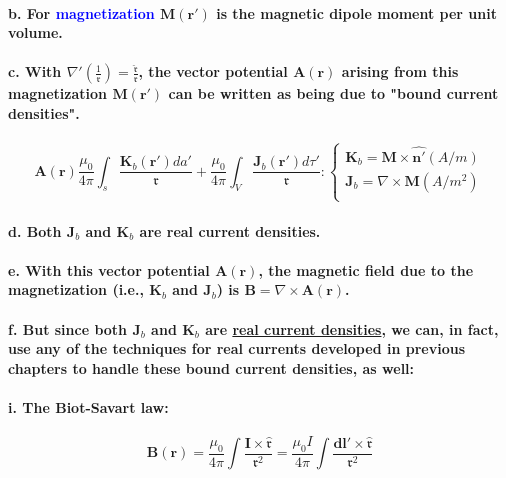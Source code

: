 \documentclass{article}
\begin{document}
\paragraph{\indent b. For \textcolor{blue}{magnetization} $\boldsymbol{M}(\boldsymbol{r}')$ is the magnetic dipole moment per unit volume.}
\paragraph{\indent c. With $\nabla'(\frac{1}{\mathfrak{r}})=\frac{\hat{\boldsymbol{\mathfrak{r}}}}{\mathfrak{r}}$, the vector potential $\boldsymbol{A}(\boldsymbol{r})$ arising from this magnetization $\boldsymbol{M}(\boldsymbol{r}')$ can be written as being due to "bound current densities".}
\begin{equation*}
    \boldsymbol{A}(\boldsymbol{r})\frac{\mu_0}{4\pi}\int_s\frac{\boldsymbol{K}_b(\boldsymbol{r}')da'}{\mathfrak{r}}+\frac{\mu_0}{4\pi}\int_V\frac{\boldsymbol{J}_b(\boldsymbol{r}')d\tau'}{\mathfrak{r}}:\begin{cases}
        \boldsymbol{K}_b=\boldsymbol{M}\times\hat{\boldsymbol{n}'}(A/m)\\
        \boldsymbol{J}_b=\nabla\times\boldsymbol{M}(A/m^2)\\
    \end{cases}
\end{equation*}
\paragraph{\indent d. Both $\boldsymbol{J}_b$ and $\boldsymbol{K}_b$ are real current densities.}
\paragraph{\indent e. With this vector potential $\boldsymbol{A}(\boldsymbol{r})$, the magnetic field due to the magnetization (i.e., $\boldsymbol{K}_b$ and $\boldsymbol{J}_b$) is $\boldsymbol{B}=\nabla\times\boldsymbol{A}(\boldsymbol{r})$.}
\paragraph{\indent f. But since both $\boldsymbol{J}_b$ and $\boldsymbol{K}_b$ are \underline{real current densities}, we can, in fact, use any of the techniques for real currents developed in previous chapters to handle these bound current densities, as well:}
\paragraph{\indent\indent i. The Biot-Savart law:}
\begin{equation*}
    \boldsymbol{B}(\boldsymbol{r})=\frac{\mu_0}{4\pi}\int\frac{\boldsymbol{I}\times\hat{\boldsymbol{\mathfrak{r}}}}{\mathfrak{r}^2}=\frac{\mu_0 I}{4\pi}\int\frac{\boldsymbol{dl}'\times\hat{\boldsymbol{\mathfrak{r}}}}{\mathfrak{r}^2}
\end{equation*}
\end{document}
